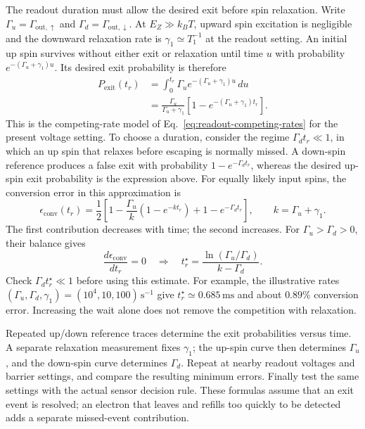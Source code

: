 The readout duration must allow the desired exit before spin
relaxation. Write $\Gamma_u=\Gamma_{\mathrm{out},\uparrow}$ and
$\Gamma_d=\Gamma_{\mathrm{out},\downarrow}$.
At $E_Z\gg k_BT$, upward spin excitation is negligible and the
downward relaxation rate is $\gamma_1\simeq T_1^{-1}$ at the
readout setting. An initial up spin survives without either
exit or relaxation until time $u$ with probability
$e^{-(\Gamma_u+\gamma_1)u}$. Its desired exit probability is
therefore
\begin{equation}
 \begin{aligned}
 P_{\mathrm{exit}}(t_r)
 &=\int_0^{t_r}\Gamma_u e^{-(\Gamma_u+\gamma_1)u}\,du\\
 &=\frac{\Gamma_u}{\Gamma_u+\gamma_1}
          \left[1-e^{-(\Gamma_u+\gamma_1)t_r}\right].
 \end{aligned}
 \label{eq:calibration-readout-duration}
\end{equation}
This is the competing-rate model of
Eq.~\eqref{eq:readout-competing-rates} for the present voltage
setting. To choose a duration,
consider the regime $\Gamma_d t_r\ll1$, in which an up spin that
relaxes before escaping is normally missed. A down-spin reference
produces a false exit with probability $1-e^{-\Gamma_d t_r}$,
whereas the desired up-spin exit probability is the expression
above. For equally likely input spins, the conversion error in
this approximation is
\begin{equation}
 \epsilon_{\mathrm{conv}}(t_r)
 =\frac12\left[
  1-\frac{\Gamma_u}{k}(1-e^{-kt_r})
  +1-e^{-\Gamma_d t_r}\right],
 \qquad k=\Gamma_u+\gamma_1.
 \label{eq:calibration-conversion-error}
\end{equation}
The first contribution decreases with time; the second increases.
For $\Gamma_u>\Gamma_d>0$, their balance gives
\begin{equation}
 \frac{d\epsilon_{\mathrm{conv}}}{dt_r}=0
 \quad\Longrightarrow\quad
 t_r^\star=\frac{\ln(\Gamma_u/\Gamma_d)}{k-\Gamma_d}.
 \label{eq:calibration-optimal-readout-time}
\end{equation}
Check $\Gamma_d t_r^\star\ll1$ before using this estimate. For
example, the illustrative rates
$(\Gamma_u,\Gamma_d,\gamma_1)=(10^4,10,100)\,\mathrm{s}^{-1}$
give $t_r^\star\simeq0.685\,\mathrm{ms}$ and about $0.89\%$
conversion error. Increasing the wait alone does not remove the
competition with relaxation.

Repeated up/down reference traces determine the exit probabilities
versus time. A separate relaxation measurement fixes $\gamma_1$;
the up-spin curve then determines $\Gamma_u$, and the down-spin
curve determines $\Gamma_d$. Repeat at nearby readout voltages and
barrier settings, and compare the resulting minimum errors.
Finally test the same settings with the actual sensor decision rule.
These formulas assume that an exit event is resolved; an electron
that leaves and refills too quickly to be detected adds a separate
missed-event contribution.


